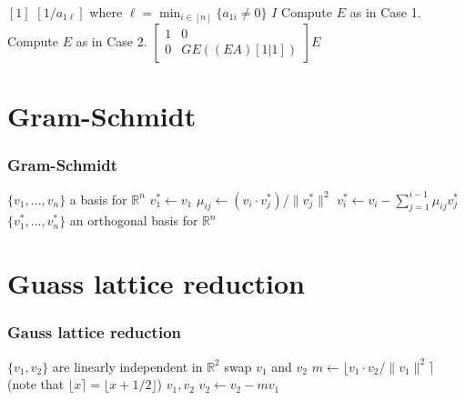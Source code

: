 \begin{frame}
\begin{algorithmic}[1]
		\RETURN $[1]$
	\ELSE
		\RETURN $[1/a_{1\ell}]$ where $\ell=\min_{i\in [n]}\{a_{1i}\neq 0\}$
	\ENDIF
\ELSE
		\RETURN $I$
	\ELSE
			\STATE Compute $E$ as in Case 1.
		\ELSE
			\STATE Compute $E$ as in Case 2.
		\ENDIF
		\RETURN $\left[\begin{array}{cc}
						1 & 0 \\
						0 & GE((EA)[1|1])
						\end{array}\right]E$
	\ENDIF
\ENDIF 
\end{algorithmic}

\end{frame}

\section{Gram-Schmidt}

\begin{frame}
\frametitle{Gram-Schmidt}

\begin{algorithmic}[1] 
\REQUIRE $\{v_1,\ldots,v_n\}$ a basis for $\mathbb{R}^n$
\STATE $v_1^*\longleftarrow v_1$ 
          \STATE $\mu_{ij}\longleftarrow (v_i\cdot v_j^*)/\|v_j^*\|^2$ 
     \ENDFOR
     \STATE $v_i^*\longleftarrow v_i-\sum_{j=1}^{i-1}\mu_{ij}v_j^*$
\ENDFOR
\ENSURE $\{v_1^*,\ldots,v_n^*\}$ an orthogonal basis for $\mathbb{R}^n$
\end{algorithmic}
\end{frame}

\section{Guass lattice reduction}

\begin{frame}
\frametitle{Gauss lattice reduction}

\begin{algorithmic}[1]
\REQUIRE $\{v_1,v_2\}$ are linearly independent in $\mathbb{R}^2$
\LOOP
		\STATE swap $v_1$ and $v_2$
	\ENDIF
	\STATE $m\longleftarrow\lfloor v_1\cdot v_2/\|v_1\|^2\rceil$
	       (note that $\lfloor x\rceil=\lfloor x+1/2\rfloor$)
		\RETURN $v_1,v_2$
	\ELSE
		\STATE $v_2\longleftarrow v_2-mv_1$
	\ENDIF
\ENDLOOP
\end{algorithmic}
\end{frame}

